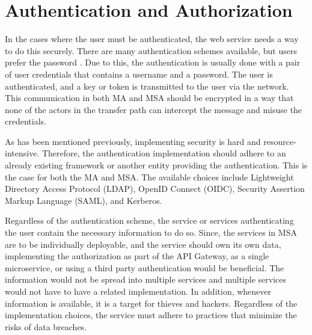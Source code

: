 \section{Authentication and Authorization}
\begin{sloppypar}
    In the cases where the user must be authenticated, the web service needs a
    way to do this securely. There are many authentication schemes available,
    but users prefer the password \citep{passwordisdead}. Due to this, the
    authentication is usually done with a pair of user credentials that contains
    a username and a password. The user is authenticated, and a key or token is
    transmitted to the user via the network. This communication in both MA and
    MSA should be encrypted in a way that none of the actors in the transfer
    path can intercept the message and misuse the credentials.
\end{sloppypar}
\begin{sloppypar}
    As has been mentioned previously, implementing security is hard and
    resource-intensive. Therefore, the authentication implementation should
    adhere to an already existing framework or another entity providing the
    authentication. This is the case for both the MA and MSA. The available
    choices include Lightweight Directory Access Protocol (LDAP), OpenID Connect
    (OIDC), Security Assertion Markup Language (SAML), and Kerberos.
\end{sloppypar}
\begin{sloppypar}
    Regardless of the authentication scheme, the service or services
    authenticating the user contain the necessary information to do so. Since,
    the services in MSA are to be individually deployable, and the service
    should own its own data, implementing the authorization as part of the API
    Gateway, as a single microservice, or using a third party authentication
    would be beneficial. The information would not be spread into multiple
    services and multiple services would not have to have a related
    implementation. In addition, whenever information is available, it is a
    target for thieves and hackers. Regardless of the implementation choices,
    the service must adhere to practices that minimize the risks of data
    breaches.
\end{sloppypar}

